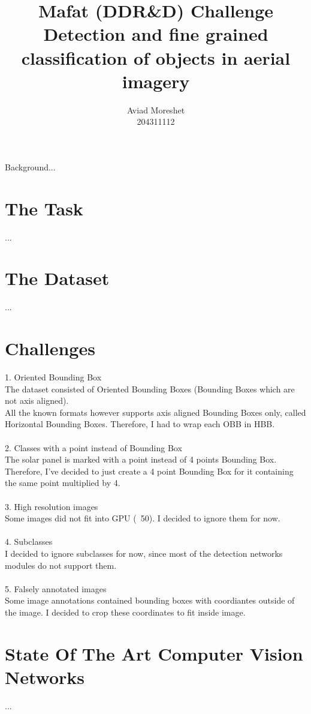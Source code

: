 \documentclass[]{article}
\title{Mafat (DDR\&D) Challenge\\
	Detection and fine grained classification of objects in aerial imagery
	}
\author{Aviad Moreshet\\204311112}
\begin{document}
\date{}
\maketitle

\begin{b}
Background...
\end{b}

\section{The Task}
...

\section{The Dataset}
...

\section{Challenges}
1. Oriented Bounding Box \\
The dataset consisted of Oriented Bounding Boxes (Bounding Boxes which are not axis aligned). \\
All the known formats however supports axis aligned Bounding Boxes only, called Horizontal Bounding Boxes. 
Therefore, I had to wrap each OBB in HBB.
\\\\
2. Classes with a point instead of Bounding Box\\
The solar panel is marked with a point instead of 4 points Bounding Box. Therefore, I've decided to just create a 4 point Bounding Box for it containing the same point multiplied by 4.
\\\\
3. High resolution images\\
Some images did not fit into GPU (~50). I decided to ignore them for now.
\\\\
4. Subclasses\\
I decided to ignore subclasses for now, since most of the detection networks modules do not support them.
\\\\
5. Falsely annotated images\\
Some image annotations contained bounding boxes with coordiantes outside of the image. I decided to crop these coordinates to fit inside image.
\section{State Of The Art Computer Vision Networks}
...
\end{document}

